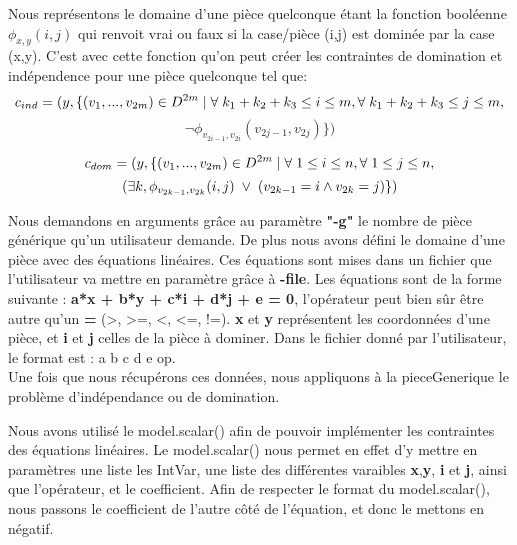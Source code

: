 \documentclass{article}
\begin{document}
Nous représentons le domaine d'une pièce quelconque étant la fonction booléenne $\phi_{x,y} (i,j)$ qui
renvoit vrai ou faux si la case/pièce (i,j) est dominée par la case (x,y). C'est avec cette fonction
qu'on peut créer les contraintes de domination et indépendence pour une pièce quelconque tel que: \\

$$ c_{ind} = ( y, \{ (v_{1}, ..., v_{2m}) \in  D^{2m} \mid \forall \hspace{0.1cm} k_{1} + k_{2} + k_{3} \leq i \leq m, \forall \hspace{0.1cm} k_{1} + k_{2} + k_{3} \leq j \leq m,$$
$$ \neg \phi_ {v_{2i-1},v_{2i}} (v_{2j-1},v_{2j}) \} ) $$

$$ c_{dom} = ( y, \{ (v_{1}, ..., v_{2m}) \in  D^{2m} \mid \forall \hspace{0.1cm} 1\leq i \leq n, \forall \hspace{0.1cm} 1\leq j \leq n,$$
$$ (\exists k, \phi_{v_{2k-1},v_{2k}} (i,j) \hspace{0.1cm} \vee \hspace{0.1cm} (v_{2k-1} = i \wedge v_{2k} = j) \} ) $$


Nous demandons en arguments grâce au paramètre \textbf{"-g"} le nombre de pièce générique qu'un utilisateur demande. De plus nous avons défini le domaine d'une pièce avec des équations linéaires. Ces équations sont mises dans un fichier que l'utilisateur va mettre en paramètre grâce à \textbf{-file}. Les équations sont de la forme suivante : \textbf{a*x + b*y + c*i + d*j + e = 0}, l'opérateur peut bien sûr être autre qu'un \textbf{=} (>, >=, <, <=, !=). \textbf{x} et \textbf{y} représentent les coordonnées d'une pièce, et \textbf{i} et \textbf{j} celles de la pièce à dominer. Dans le fichier donné par l'utilisateur, le format est : a b c d e op. \\

Une fois que nous récupérons ces données, nous appliquons à la pieceGenerique le problème d'indépendance ou de domination. 

Nous avons utilisé le model.scalar() afin de pouvoir implémenter les contraintes des équations linéaires. Le model.scalar() nous permet en effet d'y mettre en paramètres une liste les IntVar, une liste des différentes varaibles \textbf{x},\textbf{y}, \textbf{i} et \textbf{j}, ainsi que l'opérateur, et le coefficient. Afin de respecter le format du model.scalar(), nous passons le coefficient de l'autre côté de l'équation, et donc le mettons en négatif.
	
\end{document}
